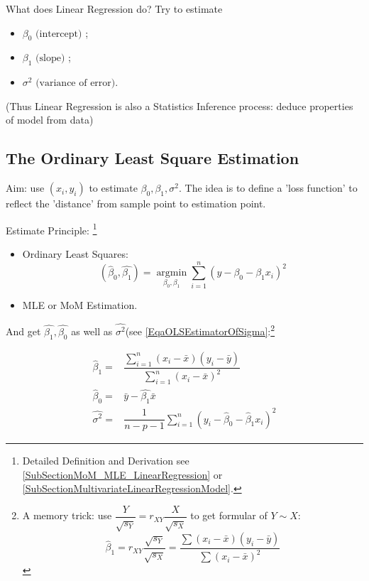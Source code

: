  
  


    What does Linear Regression do? Try to estimate 
    \begin{itemize}[topsep=0pt,itemsep=-2pt]
        \item $ \beta _0\text{ (intercept) }$;
        \item $\beta _1\text{ (slope) }$;
        \item $\sigma ^2\text{ (variance of error)} $.
    \end{itemize}
    
    
    (Thus Linear Regression is also a Statistics Inference process: deduce properties of model from data)
        
\subsection{The Ordinary Least Square Estimation}
    Aim: use $ (x_i,y_i) $  to estimate $ \beta _0,\beta _1,\sigma^2 $. The idea is to define a 'loss function' to reflect the 'distance' from sample point to estimation point.

    Estimate Principle: \footnote{Detailed Definition and Derivation see \autoref{SubSectionMoM_MLE_LinearRegression} or \autoref{SubSectionMultivariateLinearRegressionModel}.}
    \begin{itemize}[topsep=2pt,itemsep=2pt]
        \item Ordinary Least Squares:
        \begin{equation}
            (\hat{\beta  }_0,\hat{\beta _1})=\mathop{ \arg\min }\limits_{\beta _0,\beta _1} \sum_{i=1}^n (y-\beta _0-\beta _1x_i)^2
        \end{equation}
        \item MLE or MoM Estimation.
    \end{itemize}
    

    
    And get $ \hat{\beta _1},\hat{\beta _0}$ as well as $ \hat{\sigma^2} $(see \autoref{EqaOLSEstimatorOfSigma}:\footnote{A memory trick: use $ \dfrac{Y}{\sqrt{s_Y}}=r_{XY}\dfrac{X}{\sqrt{s_X}} $ to get formular of $ Y\sim X $:
    \begin{equation}
        \hat{\beta }_1=r_{XY}\dfrac{\sqrt{s_Y}}{\sqrt{s_X}}=\dfrac{{\displaystyle\sum (x_i-\bar{x})(y_i-\bar{y})}}{{\displaystyle\sum (x_i-\bar{x})^2}} 
    \end{equation}}

\begin{equation}\label{EqaOLSEstimatorOfBeta}
    \begin{aligned}
        \hat{\beta }_1=&\dfrac{\sum\limits_{i=1}^n (x_i-\bar{x})(y_i-\bar{y})}{\sum\limits_{i=1}^n (x_i-\bar{x})^2}\\
        \hat{\beta }_0=&\bar{y}-\hat{\beta _1}\bar{x}\\
        \hat{\sigma^2}=&\dfrac{1}{n-p-1}\sum_{i=1}^n(y_i-\hat{\beta }_0-\hat{\beta }_1x_i)^2
    \end{aligned}
\end{equation}


